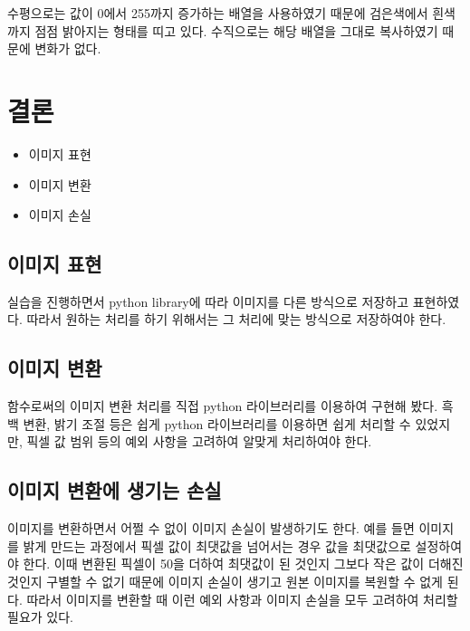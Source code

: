 \documentclass[]{report}
\begin{document}
수평으로는 값이 0에서 255까지 증가하는 배열을 사용하였기 때문에 검은색에서 흰색까지 점점 밝아지는 형태를 띠고 있다. 수직으로는 해당 배열을 그대로 복사하였기 때문에 변화가 없다. \\

\section{결론}

\begin{itemize}
\item 이미지 표현
\item 이미지 변환
\item 이미지 손실\\
\end{itemize}

\subsection{이미지 표현}

실습을 진행하면서 python library에 따라 이미지를 다른 방식으로 저장하고 표현하였다. 따라서 원하는 처리를 하기 위해서는 그 처리에 맞는 방식으로 저장하여야 한다.\\

\subsection{이미지 변환}

함수로써의 이미지 변환 처리를 직접 python 라이브러리를 이용하여 구현해 봤다. 흑백 변환, 밝기 조절 등은 쉽게 python 라이브러리를 이용하면 쉽게 처리할 수 있었지만, 픽셀 값 범위 등의 예외 사항을 고려하여 알맞게 처리하여야 한다.\\

\subsection{이미지 변환에 생기는 손실}

이미지를 변환하면서 어쩔 수 없이 이미지 손실이 발생하기도 한다. 예를 들면 이미지를 밝게 만드는 과정에서 픽셀 값이 최댓값을 넘어서는 경우 값을 최댓값으로 설정하여야 한다. 이때 변환된 픽셀이 50을 더하여 최댓값이 된 것인지 그보다 작은 값이 더해진 것인지 구별할 수 없기 때문에 이미지 손실이 생기고 원본 이미지를 복원할 수 없게 된다. 따라서 이미지를 변환할 때 이런 예외 사항과 이미지 손실을 모두 고려하여 처리할 필요가 있다.\\
\end{document}
